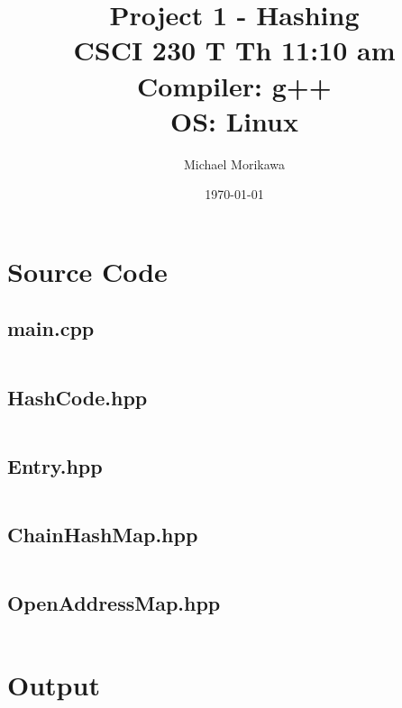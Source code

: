 \documentclass[titlepage]{article}
\title{
    Project 1 - Hashing \\
    CSCI 230 T Th 11:10 am \\
    Compiler: g++ \\
    OS: Linux
    }
\author{Michael Morikawa}
\date{\today}
\begin{document}
\maketitle

\section{Source Code}
\subsection{main.cpp}
\inputminted{c++}{../../src/main.cpp}
\subsection{HashCode.hpp}
\inputminted{c++}{../../include/HashCode.hpp}
\subsection{Entry.hpp}
\inputminted{c++}{../../include/Entry.hpp}
\subsection{ChainHashMap.hpp}
\inputminted{c++}{../../include/ChainHashMap.hpp}
\subsection{OpenAddressMap.hpp}
\inputminted{c++}{../../include/OpenAddressMap.hpp}

\section{Output}
\end{document}

